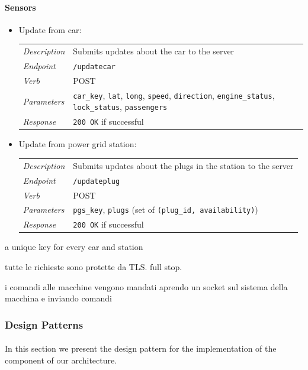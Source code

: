 \documentclass[english]{article}
\newcommand{\code}[1]{\texttt{#1}}
\begin{document}
\begin{itemize}
\paragraph{Sensors}

\begin{itemize}
	\item{Update from car:}\\
	\begin{tabular}{ | l l }
		\textit{Description} & Submits updates about the car to the server\\
		\textit{Endpoint} & \code{/updatecar} \\ 
		\textit{Verb} & POST \\  
		\textit{Parameters} & \code{car\_key}, \code{lat}, \code{long}, \code{speed}, \code{direction}, \code{engine\_status}, \code{lock\_status}, \code{passengers}\\
		\textit{Response} & \code{200 OK} if successful
	\end{tabular}
	
	\item{Update from power grid station:}\\
	\begin{tabular}{ | l l }
		\textit{Description} & Submits updates about the plugs in the station to the server\\
		\textit{Endpoint} & \code{/updateplug} \\ 
		\textit{Verb} & POST \\  
		\textit{Parameters} & \code{pgs\_key}, \code{plugs} (set of \code{(plug\_id, availability)})\\
		\textit{Response} & \code{200 OK} if successful
	\end{tabular}

\end{itemize}

a unique key for every car and station


tutte le richieste sono protette da TLS. full stop.

i comandi alle macchine vengono mandati aprendo un socket sul sistema della macchina e inviando comandi

\subsubsection{Design Patterns}

\paragraph{}
In this section we present the design pattern for the implementation of the component of our architecture.


\end{itemize}
\end{document}

